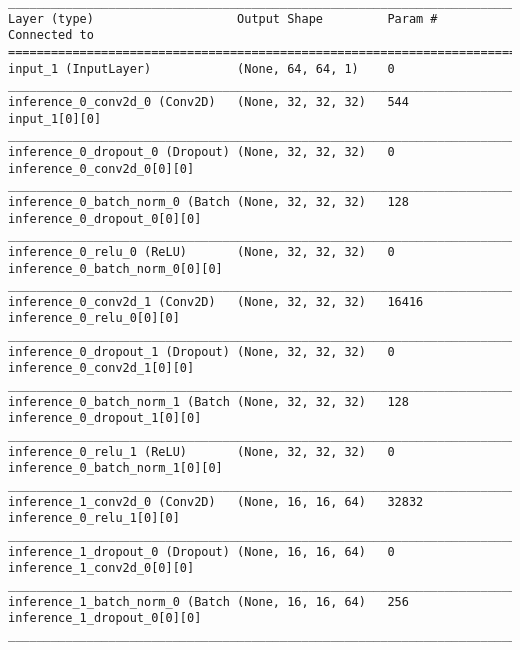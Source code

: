 \begin{lstlisting}[caption={dSprites-VLAE Encoder},captionpos=b,basicstyle=\tiny, label={lst:dsprites-vlae-encoder}]
__________________________________________________________________________________________________
Layer (type)                    Output Shape         Param #     Connected to
==================================================================================================
input_1 (InputLayer)            (None, 64, 64, 1)    0
__________________________________________________________________________________________________
inference_0_conv2d_0 (Conv2D)   (None, 32, 32, 32)   544         input_1[0][0]
__________________________________________________________________________________________________
inference_0_dropout_0 (Dropout) (None, 32, 32, 32)   0           inference_0_conv2d_0[0][0]
__________________________________________________________________________________________________
inference_0_batch_norm_0 (Batch (None, 32, 32, 32)   128         inference_0_dropout_0[0][0]
__________________________________________________________________________________________________
inference_0_relu_0 (ReLU)       (None, 32, 32, 32)   0           inference_0_batch_norm_0[0][0]
__________________________________________________________________________________________________
inference_0_conv2d_1 (Conv2D)   (None, 32, 32, 32)   16416       inference_0_relu_0[0][0]
__________________________________________________________________________________________________
inference_0_dropout_1 (Dropout) (None, 32, 32, 32)   0           inference_0_conv2d_1[0][0]
__________________________________________________________________________________________________
inference_0_batch_norm_1 (Batch (None, 32, 32, 32)   128         inference_0_dropout_1[0][0]
__________________________________________________________________________________________________
inference_0_relu_1 (ReLU)       (None, 32, 32, 32)   0           inference_0_batch_norm_1[0][0]
__________________________________________________________________________________________________
inference_1_conv2d_0 (Conv2D)   (None, 16, 16, 64)   32832       inference_0_relu_1[0][0]
__________________________________________________________________________________________________
inference_1_dropout_0 (Dropout) (None, 16, 16, 64)   0           inference_1_conv2d_0[0][0]
__________________________________________________________________________________________________
inference_1_batch_norm_0 (Batch (None, 16, 16, 64)   256         inference_1_dropout_0[0][0]
__________________________________________________________________________________________________

\end{lstlisting}
